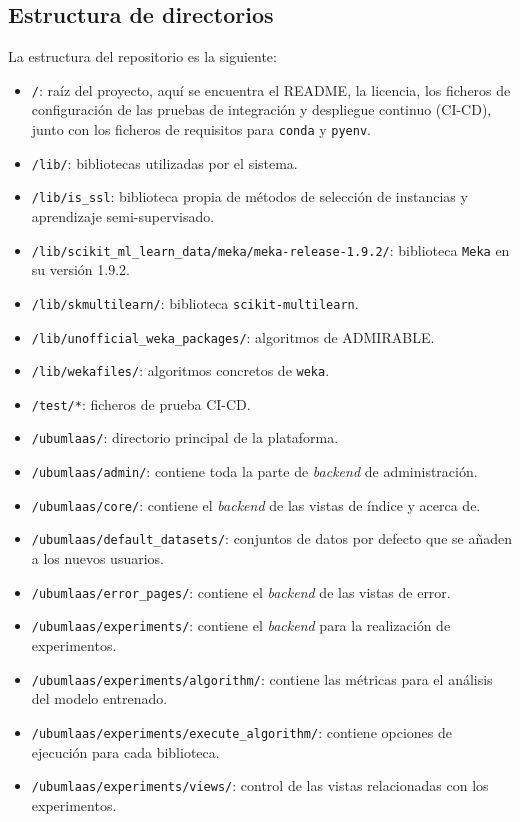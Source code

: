 \subsection{Estructura de directorios}
La estructura del repositorio es la siguiente:
\begin{itemize}
\tightlist
\item \texttt{/}: raíz del proyecto, aquí se encuentra el README, la licencia, los ficheros de configuración de las pruebas de integración y despliegue continuo (CI-CD), junto con los ficheros de requisitos para \texttt{conda} y \texttt{pyenv}. 
\item \texttt{/lib/}: bibliotecas utilizadas por el sistema.
\item \texttt{/lib/is\_ssl}: biblioteca propia de métodos de selección de instancias y aprendizaje semi-supervisado.
\item \texttt{/lib/scikit\_ml\_learn\_data/meka/meka-release-1.9.2/}: biblioteca \texttt{Meka} en su versión 1.9.2.
\item \texttt{/lib/skmultilearn/}: biblioteca \texttt{scikit-multilearn}.
\item \texttt{/lib/unofficial\_weka\_packages/}: algoritmos de ADMIRABLE.
\item \texttt{/lib/wekafiles/}: algoritmos concretos de \texttt{weka}.
\item \texttt{/test/*}: ficheros de prueba CI-CD.
\item \texttt{/ubumlaas/}: directorio principal de la plataforma.
\item \texttt{/ubumlaas/admin/}: contiene toda la parte de \textit{backend} de administración.
\item \texttt{/ubumlaas/core/}: contiene el \textit{backend} de las vistas de índice y acerca de.
\item \texttt{/ubumlaas/default\_datasets/}: conjuntos de datos por defecto que se añaden a los nuevos usuarios.
\item \texttt{/ubumlaas/error\_pages/}: contiene el \textit{backend} de las vistas de error.
\item \texttt{/ubumlaas/experiments/}: contiene el \textit{backend} para la realización de experimentos.
\item \texttt{/ubumlaas/experiments/algorithm/}: contiene las métricas para el análisis del modelo entrenado.
\item \texttt{/ubumlaas/experiments/execute\_algorithm/}: contiene opciones de ejecución para cada biblioteca.
\item \texttt{/ubumlaas/experiments/views/}: control de las vistas relacionadas con los experimentos.

\end{itemize}

